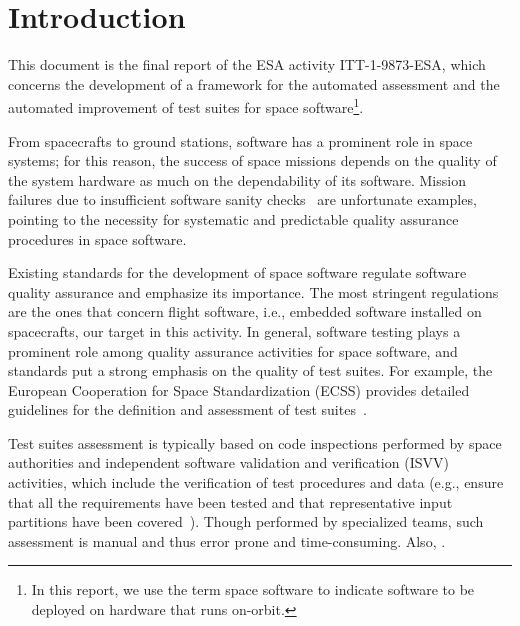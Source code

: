 
\chapter*{Introduction}
\label{sec:introduction}

This document is the final report of the ESA activity ITT-1-9873-ESA, which concerns the development of a framework for the automated assessment and the automated improvement of test suites for space software\footnote{In this report, we use the term space software to indicate software to be deployed on hardware that runs on-orbit.}.
 
From spacecrafts to ground stations, software has a prominent role in space systems; for this reason, the success of space missions depends on the quality of the system hardware as much on the dependability of its software. Mission failures due to insufficient software sanity checks~\cite{Schiaparelli} are unfortunate examples, pointing to the necessity for systematic and predictable quality assurance procedures in space software. 


Existing standards for the development of space software regulate software quality assurance and emphasize its importance. 
The most stringent regulations are the ones that concern flight software, i.e., embedded software installed on spacecrafts, our target in this activity.
In general, software testing plays a prominent role among  quality assurance activities for space software, and standards put a strong emphasis on the quality of test suites. For example, the European Cooperation for Space Standardization (ECSS) provides detailed guidelines for the definition and assessment of test suites~\cite{ecss80C,ecss40C}. 

Test suites assessment 
is typically based on code inspections performed by space authorities and
independent software validation and verification (ISVV) activities, which include the verification of test procedures and data (e.g., ensure that all the requirements have been tested and that representative input partitions have been covered~\cite{ISVV}). Though performed by specialized teams, such assessment is manual and thus error prone and time-consuming. 
 Also, . 

